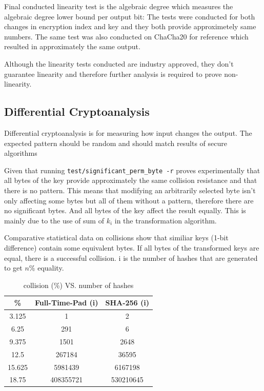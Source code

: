 \documentclass[11pt]{article}
\theoremstyle{definition}
\theoremstyle{remark}
\begin{document}
\begin{figure}[H]
\end{figure}

Final conducted linearity test is the algebraic degree which measures the algebraic degree lower bound per output bit:
The tests were conducted for both changes in encryption index and key and they both provide approximetely same numbers. The same test was also conducted on ChaCha20 for reference which resulted in approximately the same output.

Although the linearity tests conducted are industry approved, they don't guarantee linearity and therefore further analysis is required to prove non-linearity.

\subsection{Differential Cryptoanalysis} \label{diff}

Differential cryptoanalysis is for measuring how input changes the output. The expected pattern should be random and should match results of secure algorithms

Given that running \texttt{test/significant\_perm\_byte -r} proves experimentally that all bytes of the key provide approximately the same collision resistance and that there is no pattern. This means that modifying an arbitrarily selected byte isn't only affecting some bytes but all of them without a pattern, therefore there are no significant bytes. And all bytes of the key affect the result equally. This is mainly due to the use of sum of $k_i$ in the transformation algorithm. 

Comparative statistical data on collisions show that similiar keys (1-bit difference) contain some equivalent bytes.
If all bytes of the transformed keys are equal, there is a successful collision. i is the number of hashes that are generated to get $n$\% equality.

\begin{table}[H]
\centering
\begin{tabular}{|c|c|c|}
\hline
\textbf{\%} & \textbf{Full-Time-Pad (i)} & \textbf{SHA-256 (i)} \\
\hline
		3.125 & 1 & 2 \\
\hline
		6.25 & 291 & 6 \\
\hline
		9.375 & 1501 & 2648 \\
\hline
		12.5 & 267184 & 36595 \\
\hline
		15.625 & 5981439 & 6167198  \\
\hline
		18.75 & 408355721 & 530210645 \\
\hline
\end{tabular}
\caption{collision (\%) VS. number of hashes}
\end{table}
\end{document}
